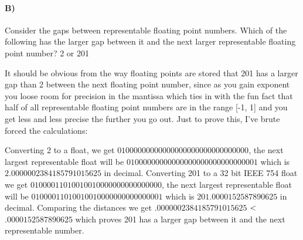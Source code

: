 \documentclass{article}
\begin{document}
\paragraph{B)}
Consider the gaps between representable floating point numbers. Which of the following has the larger gap between it and the next larger representable floating point number? 2 or 201

It should be obvious from the way floating points are stored that 201 has a larger gap than 2 between the next floating point number, since as you gain exponent you loose room for precision in the mantissa which ties in with the fun fact that half of all representable floating point numbers are in the range [-1, 1] and you get less and less precise the further you go out. Just to prove this, I've brute forced the calculations: 

Converting 2 to a float, we get $01000000000000000000000000000000$, the next largest representable float will be $01000000000000000000000000000001$ which is $2.0000002384185791015625$ in decimal. Converting 201 to a 32 bit IEEE 754 float we get $01000011010010010000000000000000$, the next largest representable float will be $01000011010010010000000000000001$ which is $201.0000152587890625$ in decimal. Comparing the distances we get $.0000002384185791015625$ $<\\$ $.0000152587890625$ which proves 201 has a larger gap between it and the next representable number. 
\end{document}
